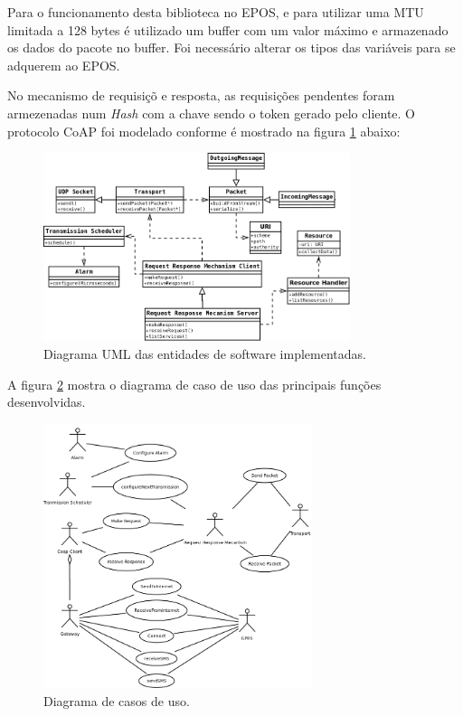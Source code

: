 Para o funcionamento desta biblioteca no EPOS, e para utilizar uma MTU limitada a 128 bytes \'e utilizado um buffer com um valor m\'aximo e armazenado os dados do pacote no buffer. Foi necess\'ario alterar os tipos das vari\'aveis para se adquerem ao EPOS.

No mecanismo de requisi\c{c}\~o e resposta, as requisi\c{c}\~oes pendentes foram armezenadas num \textit{Hash} com a chave sendo o token gerado pelo cliente. O protocolo CoAP foi modelado conforme \'e mostrado na figura \ref{uml} abaixo:
\begin{figure}[H]
   \centering
   \includegraphics[width=0.8\textwidth]{figuras/uml.png}
   \caption{Diagrama UML das entidades de software implementadas.}
   \label{uml}
\end{figure}

A figura \ref{casodeuso} mostra o diagrama de caso de uso das principais fun\c{c}\~oes desenvolvidas.
\begin{figure}[H]
   \centering
   \includegraphics[width=0.7\textwidth]{figuras/casodeuso.png}
   \caption{Diagrama de casos de uso.}
   \label{casodeuso}
\end{figure}

